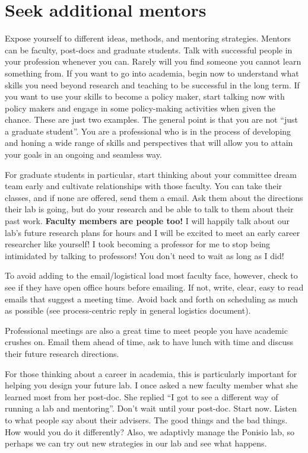 \documentclass[12pt]{article}
\begin{document}
\section{Seek additional mentors}
\label{sec:mentors}
Expose yourself to different ideas, methods, and mentoring
strategies. Mentors can be faculty, post-docs and graduate
students. Talk with successful people in your profession whenever you
can. Rarely will you find someone you cannot learn something from. If
you want to go into academia, begin now to understand what skills you
need beyond research and teaching to be successful in the long term. If
you want to use your skills to become a policy maker, start talking
now with policy makers and engage in some policy-making activities
when given the chance. These are just two examples. The general point
is that you are not ``just a graduate student''. You are a
professional who is in the process of developing and honing a wide
range of skills and perspectives that will allow you to attain your
goals in an ongoing and seamless way.

For graduate students in particular, start thinking about your
committee dream team early and cultivate relationships with those
faculty. You can take their classes, and if none are offered, send
them a email. Ask them about the directions their lab is going, but do
your research and be able to talk to them about their past
work. \textbf{Faculty members are people too!} I will happily talk
about our lab's future research plans for hours and I will be excited
to meet an early career researcher like yourself! I took becoming a
professor for me to stop being intimidated by talking to professors!
You don't need to wait as long as I did!

To avoid adding to the email/logistical load most faculty face,
however, check to see if they have open office hours before
emailing. If not, write, clear, easy to read emails that suggest a
meeting time. Avoid back and forth on scheduling as much as
possible (see process-centric reply in general logistics document).

Professional meetings are also a great time to meet people you have
academic crushes on. Email them ahead of time, ask to have lunch with
time and discuss their future research directions.

For those thinking about a career in academia, this is particularly
important for helping you design your future lab. I once asked a new
faculty member what she learned most from her post-doc. She replied
``I got to see a different way of running a lab and mentoring''. Don't
wait until your post-doc. Start now. Listen to what people say about
their advisers. The good things and the bad things. How would you do it
differently? Also, we adaptivly manage the Ponisio lab, so perhaps we
can try out new strategies in our lab and see what happens.
\end{document}
